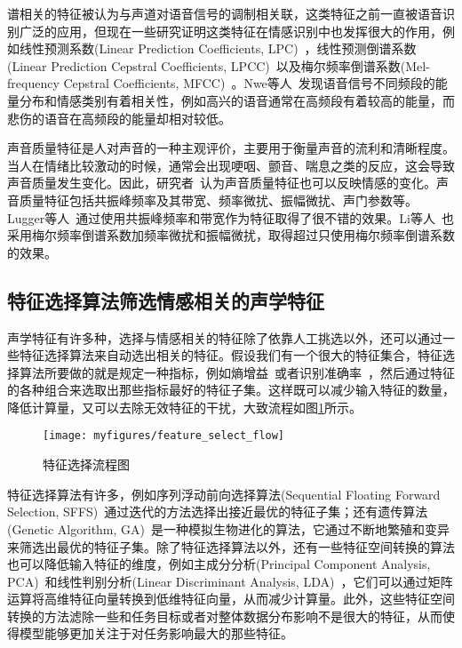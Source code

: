 谱相关的特征被认为与声道对语音信号的调制相关联，这类特征之前一直被语音识别广泛的应用，但现在一些研究证明这类特征在情感识别中也发挥很大的作用，例如线性预测系数(Linear Prediction Coefficients, LPC)~\cite{Ackroyd1997Digital}，线性预测倒谱系数(Linear Prediction Cepstral Coefficients, LPCC)~\cite{Atal1974Effectiveness}以及梅尔频率倒谱系数(Mel-frequency Cepstral Coefficients, MFCC)~\cite{Rabiner1999Fundamentals, Proakis1993Discrete}。Nwe等人~\cite{Nogueiras2012Speech}发现语音信号不同频段的能量分布和情感类别有着相关性，例如高兴的语音通常在高频段有着较高的能量，而悲伤的语音在高频段的能量却相对较低。

声音质量特征是人对声音的一种主观评价，主要用于衡量声音的流利和清晰程度。当人在情绪比较激动的时候，通常会出现哽咽、颤音、喘息之类的反应，这会导致声音质量发生变化。因此，研究者~\cite{Gobl2003The}认为声音质量特征也可以反映情感的变化。声音质量特征包括共振峰频率及其带宽、频率微扰、振幅微扰、声门参数等。Lugger等人~\cite{Lugger2007The, Lugger2008Psychological, Lugger2015Combining}通过使用共振峰频率和带宽作为特征取得了很不错的效果。Li等人~\cite{Li2007Stress}也采用梅尔频率倒谱系数加频率微扰和振幅微扰，取得超过只使用梅尔频率倒谱系数的效果。

\subsection{特征选择算法筛选情感相关的声学特征}
\label{ssec:algorithm_select}
声学特征有许多种，选择与情感相关的特征除了依靠人工挑选以外，还可以通过一些特征选择算法来自动选出相关的特征。假设我们有一个很大的特征集合，特征选择算法所要做的就是规定一种指标，例如熵增益~\cite{Dhillon2003A}或者识别准确率~\cite{Dietterich1998Approximate}，然后通过特征的各种组合来选取出那些指标最好的特征子集。这样既可以减少输入特征的数量，降低计算量，又可以去除无效特征的干扰，大致流程如图\ref{fig:feature_select_flow}所示。

\begin{figure}[htb] %
    \vspace{-0.8cm}  %
    \setlength{\belowcaptionskip}{0cm}   %
    \centering
    \texttt{[image: myfigures/feature\_select\_flow]}
    \caption{特征选择流程图}
    \label{fig:feature_select_flow}
\end{figure}

特征选择算法有许多，例如序列浮动前向选择算法(Sequential Floating Forward Selection, SFFS)~\cite{Ververidis2008Fast}通过迭代的方法选择出接近最优的特征子集；还有遗传算法(Genetic Algorithm, GA)~\cite{Yang1998Feature}是一种模拟生物进化的算法，它通过不断地繁殖和变异来筛选出最优的特征子集。除了特征选择算法以外，还有一些特征空间转换的算法也可以降低输入特征的维度，例如主成分分析(Principal Component Analysis, PCA)~\cite{Ben2003Detecting}和线性判别分析(Linear Discriminant Analysis, LDA)~\cite{Blum1997Selection}，它们可以通过矩阵运算将高维特征向量转换到低维特征向量，从而减少计算量。此外，这些特征空间转换的方法滤除一些和任务目标或者对整体数据分布影响不是很大的特征，从而使得模型能够更加关注于对任务影响最大的那些特征。


